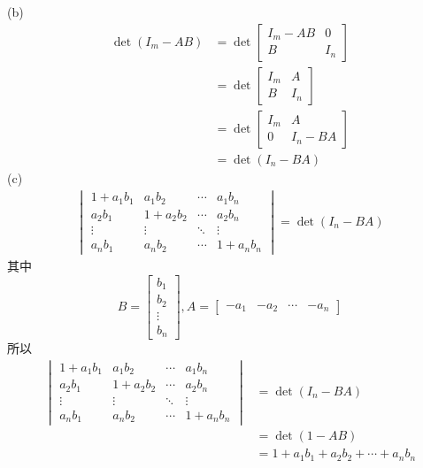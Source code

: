\documentclass[utf8]{ctexart}
\begin{document}
(b)
\begin{align*}
	\det(I_m-AB)&=\det\begin{bmatrix}
		I_m-AB&0\\
		B&I_n
	\end{bmatrix}\\
	&=\det\begin{bmatrix}
		I_m&A\\
		B&I_n
	\end{bmatrix}\\
	&=\det\begin{bmatrix}
		I_m&A\\
		0&I_n-BA
	\end{bmatrix}\\
	&=\det(I_n-BA)
\end{align*}
(c)
\begin{align*}
	\begin{vmatrix}
		1+a_1b_1&a_1b_2&\cdots&a_1b_n\\
		a_2b_1&1+a_2b_2&\cdots&a_2b_n\\
		\vdots&\vdots&\ddots&\vdots\\
		a_nb_1&a_nb_2&\cdots&1+a_nb_n
	\end{vmatrix}=\det(I_n-BA)
\end{align*}
其中
\[B=\begin{bmatrix}
	b_1\\
	b_2\\
	\vdots\\
	b_n
\end{bmatrix},A=\begin{bmatrix}
-a_1&-a_2&\cdots&-a_n
\end{bmatrix}\]
所以
\begin{align*}
	\begin{vmatrix}
		1+a_1b_1&a_1b_2&\cdots&a_1b_n\\
		a_2b_1&1+a_2b_2&\cdots&a_2b_n\\
		\vdots&\vdots&\ddots&\vdots\\
		a_nb_1&a_nb_2&\cdots&1+a_nb_n
	\end{vmatrix}&=\det(I_n-BA)\\
	&=\det(1-AB)\\
	&=1+a_1b_1+a_2b_2+\cdots+a_nb_n
\end{align*}
\end{document}
